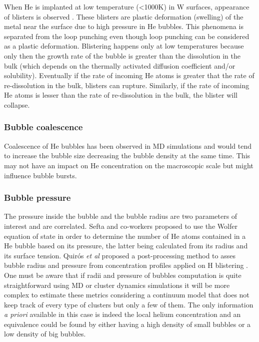 When He is implanted at low temperature (<1000K) in W surfaces, appearance of blisters is observed \cite{baldwin_formation_2010}.
These blisters are plastic deformation (swelling) of the metal near the surface due to high pressure in He bubbles.
This phenomena is separated from the loop punching even though loop punching can be considered as a plastic deformation.
Blistering happens only at low temperatures because only then the growth rate of the bubble is greater than the dissolution in the bulk (which depends on the thermally activated diffusion coefficient and/or solubility).
Eventually if the rate of incoming He atoms is greater that the rate of re-dissolution in the bulk, blisters can rupture.
Similarly, if the rate of incoming He atoms is lesser than the rate of re-dissolution in the bulk, the blister will collapse.

\subsubsection{Bubble coalescence}
Coalescence of He bubbles has been observed in MD simulations \cite{hamid_molecular_2019, hammond_helium_2019, zhang_simulation_2019} and would tend to increase the bubble size decreasing the bubble density at the same time.
This may not have an impact on He concentration on the macroscopic scale but might influence bubble bursts.
\subsubsection{Bubble pressure}
The pressure inside the bubble and the bubble radius are two parameters of interest and are correlated.
Sefta and co-workers \cite{sefta_surface_2013} proposed to use the Wolfer equation of state in order to determine the number of He atoms contained in a He bubble based on its pressure, the latter being calculated from its radius and its surface tension.
Quir\'os \textit{et al} proposed a post-processing method to asses bubble radius and pressure from concentration profiles applied on H blistering \cite{quiros_blister_2017}.
One must be aware that if radii and pressure of bubbles computation is quite straightforward using MD \cite{zhang_simulation_2019} or cluster dynamics \cite{faney_spatially_2014-1} simulations it will be more complex to estimate these metrics considering a continuum model that does not keep track of every type of clusters but only a few of them.
The only information \textit{a priori} available in this case is indeed the local helium concentration and an equivalence could be found by either having a high density of small bubbles or a low density of big bubbles.


